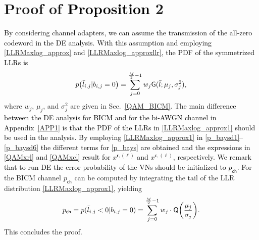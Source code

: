 \documentclass[journal]{IEEEtran}
\newcommand{\mep}{{x}}
\newcommand{\row}{\mathsf{r}}
\newcommand{\col}{\mathsf{c}}
\newcommand{\Q}{\mathsf{Q}}
\newcommand{\G}{\mathsf{G}}
\newcommand{\GL}{\textcolor{black}}
\newcommand{\AG}{\textcolor{black}}
\let\originalleft\left
\let\originalright\right
\renewcommand{\left}{\mathopen{}\mathclose\bgroup\originalleft}
\renewcommand{\right}{\aftergroup\egroup\originalright}
\newcommand\scalemath[2]{\scalebox{#1}{\mbox{\ensuremath{\displaystyle #2}}}}   %
\begin{document}
\section{Proof of \GL{Proposition} 2} \label{AB} 
\AG{By considering channel adapters, we can  assume the transmission of the all-zero codeword  in the DE analysis. With this assumption  and employing \eqref{LLRMaxlog_approx} and \eqref{LLRMaxlog_approxllr}, the PDF of the symmetrized LLRs is}
\begin{align} \label{LLRMaxlog_approx1}
p\left( {\bar l_{i,j}|b_{i,j} = 0} \right) = \sum\limits_{j = 0}^{\frac{M}{2} - 1} {{w_j}} {\G}(\bar l;{\mu _j},\sigma _j^2),
\end{align}
where $w_j$, $\mu _j$, and $\sigma _j^2$ are given in Sec.~\ref{QAM_BICM}. 
The \AG{main difference between the DE analysis for BICM and for the bi-AWGN channel  in Appendix~\ref{APP1} is that  the PDF of the LLRs in \eqref{LLRMaxlog_approx1} should be used in the analysis. By employing \eqref{LLRMaxlog_approx1} in \eqref{p_baysd1}--\eqref{p_baysd6} the different terms for \eqref{p_bays} are obtained and the expressions in \eqref{QAMxrl} and \eqref{QAMxcl} result for $\mep^{\row,(\ell)}$ and $\mep^{\col,(\ell)}$, respectively. We remark that to run DE  the error probability of the VNs should be initialized to $p_\mathsf{ch}$}. For the BICM channel $p_\mathsf{ch}$ can be computed by integrating the tail of the LLR distribution \eqref{LLRMaxlog_approx1}, yielding
\begin{align} \label{pch_computation}
p_\mathsf{ch} = p(\bar l_{i,j}<0|b_{i,j} = 0)=\sum\limits_{j = 0}^{\frac{M}{2} - 1} {{w_j}}\cdot\Q\left(\frac{\mu_j}{\sigma_j}\right).
\end{align}  
This concludes the proof.
\end{document}
